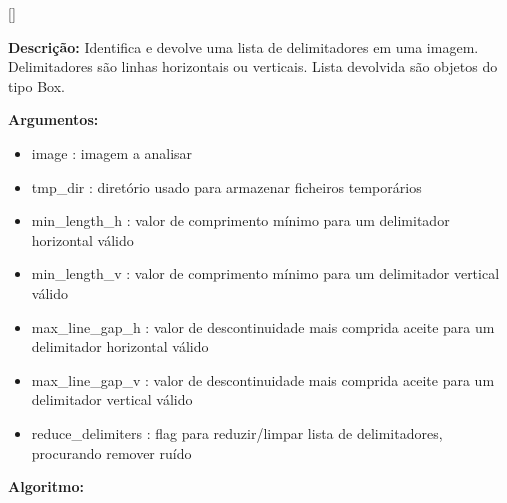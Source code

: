 [\normalsize]

\textbf{Descrição:} Identifica e devolve uma lista de delimitadores em uma imagem. Delimitadores são linhas horizontais ou verticais. Lista devolvida são objetos do tipo Box.


\textbf{Argumentos:}
\begin{itemize}\setlength\itemsep{-0.3em}
	\item image : imagem a analisar
	\item tmp\_dir : diretório usado para armazenar ficheiros temporários
	\item min\_length\_h : valor de comprimento mínimo para um delimitador horizontal válido
	\item min\_length\_v : valor de comprimento mínimo para um delimitador vertical válido
	\item max\_line\_gap\_h : valor de descontinuidade mais comprida aceite para um delimitador horizontal válido
	\item max\_line\_gap\_v : valor de descontinuidade mais comprida aceite para um delimitador vertical válido
	\item reduce\_delimiters : flag para reduzir/limpar lista de delimitadores, procurando remover ruído
\end{itemize}

\textbf{Algoritmo:}


